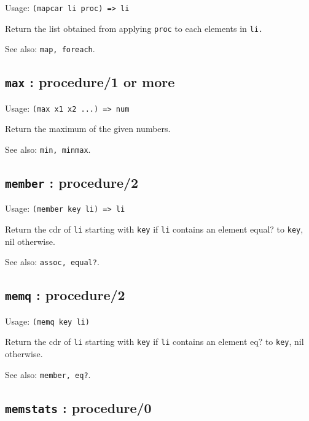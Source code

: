 \documentclass[
]{article}
\newcommand{\passthrough}[1]{#1}
\begin{document}
Usage: \passthrough{\lstinline!(mapcar li proc) => li!}

Return the list obtained from applying \passthrough{\lstinline!proc!} to
each elements in \passthrough{\lstinline!li.!}

See also: \passthrough{\lstinline!map, foreach!}.

\hypertarget{max-procedure1-or-more-1}{%
\subsection{\texorpdfstring{\texttt{max} : procedure/1 or
more}{max : procedure/1 or more}}\label{max-procedure1-or-more-1}}

Usage: \passthrough{\lstinline!(max x1 x2 ...) => num!}

Return the maximum of the given numbers.

See also: \passthrough{\lstinline!min, minmax!}.

\hypertarget{member-procedure2-1}{%
\subsection{\texorpdfstring{\texttt{member} :
procedure/2}{member : procedure/2}}\label{member-procedure2-1}}

Usage: \passthrough{\lstinline!(member key li) => li!}

Return the cdr of \passthrough{\lstinline!li!} starting with
\passthrough{\lstinline!key!} if \passthrough{\lstinline!li!} contains
an element equal? to \passthrough{\lstinline!key!}, nil otherwise.

See also: \passthrough{\lstinline!assoc, equal?!}.

\hypertarget{memq-procedure2-1}{%
\subsection{\texorpdfstring{\texttt{memq} :
procedure/2}{memq : procedure/2}}\label{memq-procedure2-1}}

Usage: \passthrough{\lstinline!(memq key li)!}

Return the cdr of \passthrough{\lstinline!li!} starting with
\passthrough{\lstinline!key!} if \passthrough{\lstinline!li!} contains
an element eq? to \passthrough{\lstinline!key!}, nil otherwise.

See also: \passthrough{\lstinline!member, eq?!}.

\hypertarget{memstats-procedure0-1}{%
\subsection{\texorpdfstring{\texttt{memstats} :
procedure/0}{memstats : procedure/0}}\label{memstats-procedure0-1}}
\end{document}
